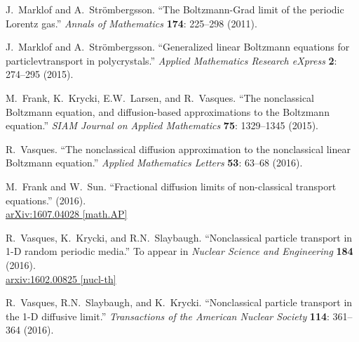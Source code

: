 \documentclass[12pt]{article}
\begin{document}
\begin{thebibliography}{10}
J.~Marklof and A.~Str\"ombergsson.
``The Boltzmann-Grad limit of the periodic Lorentz gas.''
\textit{Annals of Mathematics} \textbf{174}: 225--298 (2011).
\vspace{-5pt}

J.~Marklof and A.~Str\"ombergsson.
``Generalized linear Boltzmann equations for particlevtransport in polycrystals.''
\textit{Applied Mathematics Research eXpress} \textbf{2}: 274--295 (2015).
\vspace{-5pt}

M.~Frank, K.~Krycki, E.W.~Larsen, and R.~Vasques.
``The nonclassical Boltzmann equation, and diffusion-based approximations to the Boltzmann equation.''
\textit{SIAM Journal on Applied Mathematics} \textbf{75}: 1329--1345 (2015). \vspace{-5pt}

R.~Vasques.
``The nonclassical diffusion approximation to the nonclassical linear Boltzmann equation.''
\textit{Applied Mathematics Letters} \textbf{53}: 63--68 (2016).
\vspace{-5pt}

M.~Frank and W.~Sun.
``Fractional diffusion limits of non-classical transport equations.'' (2016).\\
\href{http://arxiv.org/pdf/1607.04028.pdf}{arXiv:1607.04028 [math.AP]}
\vspace{-5pt}

R.~Vasques, K.~Krycki, and R.N.~Slaybaugh.
``Nonclassical particle transport in 1-D random periodic media.''
To appear in \textit{Nuclear Science and Engineering} \textbf{184} (2016).\\
\href{http://arxiv.org/pdf/1602.00825v2.pdf}{arxiv:1602.00825 [nucl-th]} \vspace{-5pt}

R.~Vasques, R.N.~Slaybaugh, and K.~Krycki.
``Nonclassical particle transport in the 1-D diffusive limit.''
\textit{Transactions of the American Nuclear Society} \textbf{114}: 361--364 (2016).
\vspace{-5pt}


\end{thebibliography}
\end{document}
